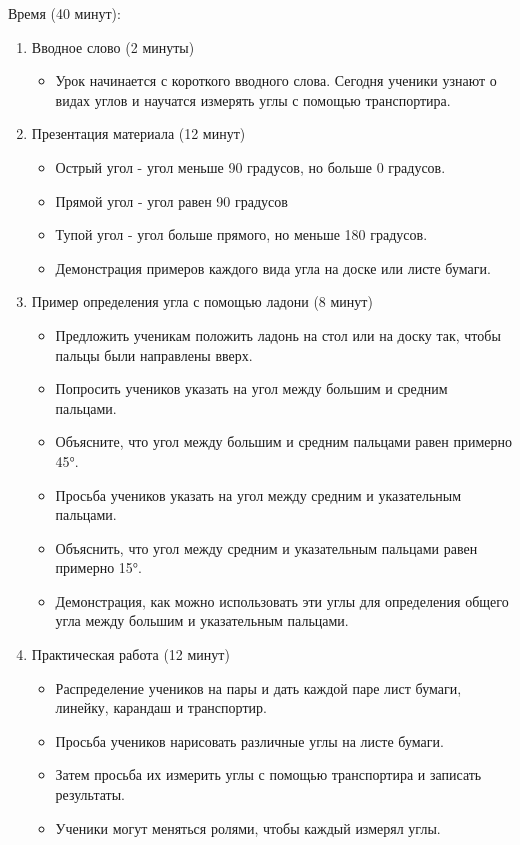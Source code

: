 \documentclass[a4paper,12pt]{article}
\begin{document}
Время (40 минут):
\begin{enumerate}
\item Вводное слово (2 минуты)
	\begin{itemize}
	\item Урок начинается с короткого вводного слова. Сегодня ученики узнают о видах углов и научатся измерять углы с помощью транспортира.
	\end{itemize}

\item Презентация материала (12 минут)
	\begin{itemize}
	\item Острый угол - угол меньше 90 градусов, но больше 0 градусов.
	\item Прямой угол - угол равен 90 градусов
	\item Тупой угол - угол больше прямого, но меньше 180 градусов.
	\item Демонстрация примеров каждого вида угла на доске или листе бумаги.
	\end{itemize}

\item Пример определения угла с помощью ладони (8 минут)
	\begin{itemize}
	\item Предложить ученикам положить ладонь на стол или на доску так, чтобы пальцы были направлены вверх.
	\item Попросить учеников указать на угол между большим и средним пальцами.
	\item Объясните, что угол между большим и средним пальцами равен примерно 45°.
	\item Просьба учеников указать на угол между средним и указательным пальцами.
	\item Объяснить, что угол между средним и указательным пальцами равен примерно 15°.
	\item Демонстрация, как можно использовать эти углы для определения общего угла между большим и указательным пальцами.
	\end{itemize}

\item Практическая работа (12 минут)
	\begin{itemize}
	\item Распределение учеников на пары и дать каждой паре лист бумаги, линейку, карандаш и транспортир.
	\item Просьба учеников нарисовать различные углы на листе бумаги.
	\item Затем просьба их измерить углы с помощью транспортира и записать результаты.
	\item Ученики могут меняться ролями, чтобы каждый измерял углы.
	\end{itemize}


\end{enumerate}
\end{document}
